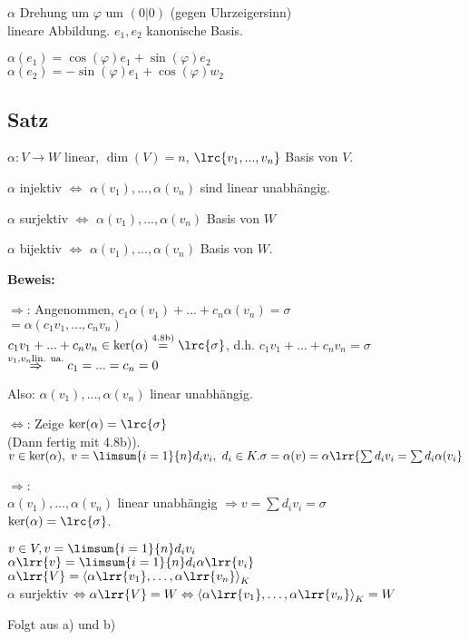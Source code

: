   $\alpha$ Drehung um $\varphi$ um $(0|0)$ (gegen Uhrzeigersinn)\\
  lineare Abbildung. $e_1,e_2$ kanonische Basis.

  $\alpha(e_1)=\cos(\varphi)e_1+\sin(\varphi)e_2$\\
  $\alpha(e_2)=-\sin(\varphi)e_1+\cos(\varphi)w_2$

  \subsection{Satz}

  $\alpha:V\rightarrow W$ linear, $\dim(V)=n$, $\lrc{v_1,...,v_n}$ Basis von $V$.

    \item $\alpha$ injektiv $\Leftrightarrow$ $\alpha(v_1),...,\alpha(v_n)$
      sind linear unabhängig.
    \item $\alpha$ surjektiv $\Leftrightarrow$ $\alpha(v_1),...,\alpha(v_n)$
      Basis von $W$
    \item $\alpha$ bijektiv $\Leftrightarrow$ $\alpha(v_1),...,\alpha(v_n)$
      Basis von $W$.
  \subExEnd

  \textbf{Beweis:}
    \item
      $\Rightarrow$: Angenommen, $c_1\alpha(v_1)+...+c_n\alpha(v_n)=\sigma$\\
      $=\alpha(c_1v_1,...,c_nv_n)$\\
      $c_1v_1+...+c_nv_n\in\mbox{ker}(\alpha)\overset{\mbox{\scriptsize 4.8b)}}{=}\lrc{\sigma}$, d.h. $c_1v_1+...+c_nv_n=\sigma$\\
      $\overset{v_1,v_n\mbox{\scriptsize lin. ua.}}{\Rightarrow} c_1=...=c_n=0$

      Also: $\alpha(v_1),\dots,\alpha(v_n)$ linear unabhängig.

      $\Leftrightarrow$: Zeige $\mbox{ker}(\alpha)=\lrc{\sigma}$\\
      (Dann fertig mit 4.8b)).\\
      $v\in\mbox{ker}(\alpha),\ v=\limsum{i=1}{n}d_iv_i,\ d_i\in K.\\
      \sigma=\alpha(v)=\alpha\lrr{\sum d_iv_i=\sum d_i\alpha(v_i}$

      $\Rightarrow$:\\
      $\alpha(v_1),...,\alpha(v_n)$ linear unabhängig $\Rightarrow v=\sum
      d_iv_i=\sigma$\\
      $\mbox{ker}(\alpha)=\lrc{\sigma}$.
     \item $v\in V, v=\limsum{i=1}{n}d_iv_i$\\
		$\alpha\lrr{v}=\limsum{i=1}{n}d_i\alpha\lrr{v_i}$\\
		$\alpha\lrr{V}=\left\langle\alpha\lrr{v_1},\dots,\alpha\lrr{v_n}\right\rangle_K$\\
		$\alpha$ surjektiv $\Leftrightarrow \alpha\lrr{V}=W \Leftrightarrow\left\langle\alpha\lrr{v_1},\dots,\alpha\lrr{v_n}\right\rangle_K=W$
	 \item Folgt aus a) und b)
	\subExEnd
	
